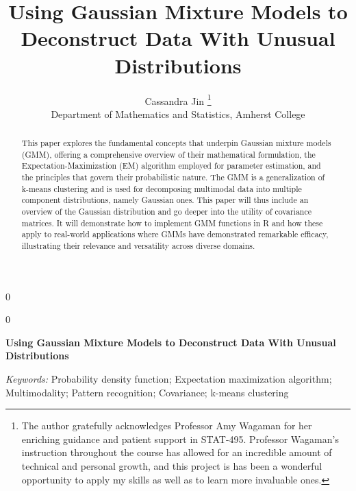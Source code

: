 \documentclass[12pt]{article}
\newcommand{\blind}{0}
\begin{document}
\def\spacingset#1{\renewcommand{\baselinestretch}%
{#1}\small\normalsize} \spacingset{1}



\blind
{
  \title{\bf Using Gaussian Mixture Models to Deconstruct Data With
Unusual Distributions}

  \author{
        Cassandra Jin \thanks{The author gratefully acknowledges
Professor Amy Wagaman for her enriching guidance and patient support in
STAT-495. Professor Wagaman's instruction throughout the course has
allowed for an incredible amount of technical and personal growth, and
this project is has been a wonderful opportunity to apply my skills as
well as to learn more invaluable ones.} \\
    Department of Mathematics and Statistics, Amherst College\\
      }
  \maketitle
} \fi

\blind
{
  \bigskip
  \bigskip
  \bigskip
  \begin{center}
    {\LARGE\bf Using Gaussian Mixture Models to Deconstruct Data With
Unusual Distributions}
  \end{center}
  \medskip
} \fi

\bigskip
\begin{abstract}
This paper explores the fundamental concepts that underpin Gaussian
mixture models (GMM), offering a comprehensive overview of their
mathematical formulation, the Expectation-Maximization (EM) algorithm
employed for parameter estimation, and the principles that govern their
probabilistic nature. The GMM is a generalization of k-means clustering
and is used for decomposing multimodal data into multiple component
distributions, namely Gaussian ones. This paper will thus include an
overview of the Gaussian distribution and go deeper into the utility of
covariance matrices. It will demonstrate how to implement GMM functions
in R and how these apply to real-world applications where GMMs have
demonstrated remarkable efficacy, illustrating their relevance and
versatility across diverse domains.
\end{abstract}

\noindent%
{\it Keywords:} Probability density function; Expectation maximization
algorithm; Multimodality; Pattern recognition; Covariance; k-means
clustering
\end{document}
